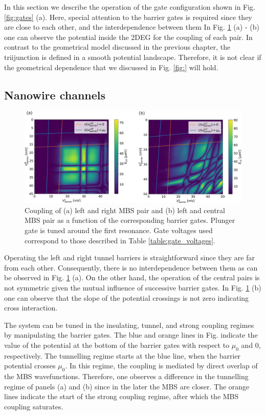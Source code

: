 In this section we describe the operation of the gate configuration shown in Fig. \ref{fig:gates} (a).
Here, special attention to the barrier gates is required since they are close to each other, and the interdependence between them
In Fig.  \ref{fig:device_1_barriers} (a) - (b) one can observe the potential inside the 2DEG for the coupling of each pair.
In contrast to the geometrical model discussed in the previous chapter, the triijunction is defined in a smooth potential landscape.
Therefore, it is not clear if the geometrical dependence that we discussed in Fig. \ref{fig:} will hold.

\subsection{Nanowire channels}

\begin{figure}[h!]
\centering
  \includegraphics[width=\linewidth]{figures/device_1_barriers.pdf}
  \caption{Coupling of (a) left and right MBS pair and (b) left and central MBS pair as a function of the corresponding barrier gates. Plunger gate is tuned around the first resonance. Gate voltages used correspond to those described in Table \ref{table:gate_voltages}.}
  \label{fig:device_1_barriers}
\end{figure}

Operating the left and right tunnel barriers is straightforward since they are far from each other.
Consequently, there is no interdependence between them as can be observed in Fig. \ref{fig:device_1_barriers} (a).
On the other hand, the operation of the central pairs is not symmetric given the mutual influence of successive barrier gates.
In Fig. \ref{fig:device_1_barriers} (b) one can observe that the slope of the potential crossings is not zero indicating cross interaction.

The system can be tuned in the insulating, tunnel, and strong coupling regimes by manipulating the barrier gates.
The blue and orange lines in Fig. indicate the value of the potential at the bottom of the barrier gates with respect to $\mu_0$ and $0$, respectively.
The tunnelling regime starts at the blue line, when the barrier potential crosses $\mu_0$.
In this regime, the coupling is mediated by direct overlap of the MBS wavefunctions.
Therefore, one observes a difference in the tunnelling regime of panels (a) and (b) since in the later the MBS are closer.
The orange lines indicate the start of the strong coupling regime, after which the MBS coupling saturates.


